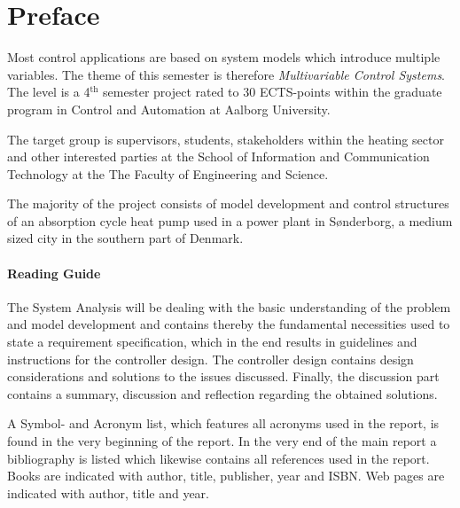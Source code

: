 \chapter*{Preface}
\vspace{-0.5cm}
Most control applications are based on system models which introduce multiple variables. The theme of this 
semester is therefore \textit{Multivariable Control Systems}. The level is a 4$^\text{th}$ semester project rated to 30 ECTS-points within the graduate program in Control and Automation at Aalborg University.

The target group is supervisors, students, stakeholders within the heating sector and other interested parties at the School of Information and Communication Technology at the The Faculty of Engineering and Science.

The majority of the project consists of model development and control structures of an absorption cycle heat pump used in a power plant in S\o nderborg, a medium sized city in the southern part of Denmark.
\subsubsection{Reading Guide}
The System Analysis will be dealing with the basic understanding of the problem and model development and  contains thereby the fundamental necessities used to state a requirement specification, which in the end results in guidelines and instructions for the controller design. The controller design contains design considerations and solutions to the issues discussed. Finally, the discussion part contains a summary, discussion and reflection regarding the obtained solutions.

A Symbol- and Acronym list, which features all acronyms used in the report, is found in the very beginning of the report. In the very end of the main report a bibliography is listed which likewise contains all references used in the report. Books are indicated with author, title, publisher, year and ISBN. Web pages are indicated with author, title and year.

